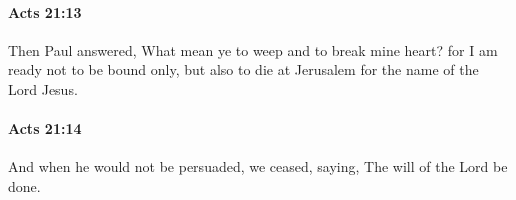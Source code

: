 		\paragraph{Acts 21:13} %
			\label{ACTS-21-13}

			Then Paul answered, What mean ye to weep and to break mine heart?  for I am ready not to be bound only, but also to die at Jerusalem for the name of the Lord Jesus.

			\begin{framed}
			\scriptsize
				\begin{compactdesc}
					\item[SBLG] 
				\end{compactdesc}
			\end{framed}

		\paragraph{Acts 21:14} %
			\label{ACTS-21-14}

			And when he would not be persuaded, we ceased, saying, The will of the Lord be done.

